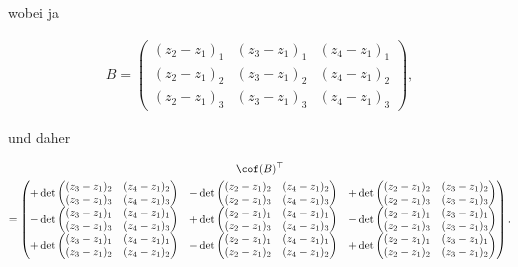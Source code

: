 \begin{solution}
wobei ja

\begin{align*}
  B
  =
  \begin{pmatrix}
    (z_2 - z_1)_1 & (z_3 - z_1)_1 & (z_4 - z_1)_1 \\
    (z_2 - z_1)_2 & (z_3 - z_1)_2 & (z_4 - z_1)_2 \\
    (z_2 - z_1)_3 & (z_3 - z_1)_3 & (z_4 - z_1)_3
  \end{pmatrix},
\end{align*}

und daher

\begin{multline*}
  \cof(B)^\top \\
  =
  \begin{pmatrix}
    +
    \det
    \begin{pmatrix}
      (z_3 - z_1)_2 & (z_4 - z_1)_2 \\
      (z_3 - z_1)_3 & (z_4 - z_1)_3
    \end{pmatrix}
    &
    -
    \det
    \begin{pmatrix}
      (z_2 - z_1)_2 & (z_4 - z_1)_2 \\
      (z_2 - z_1)_3 & (z_4 - z_1)_3
    \end{pmatrix}
    &
    +
    \det
    \begin{pmatrix}
      (z_2 - z_1)_2 & (z_3 - z_1)_2 \\
      (z_2 - z_1)_3 & (z_3 - z_1)_3
    \end{pmatrix}
    \\
    -
    \det
    \begin{pmatrix}
      (z_3 - z_1)_1 & (z_4 - z_1)_1 \\
      (z_3 - z_1)_3 & (z_4 - z_1)_3
    \end{pmatrix}
    &
    +
    \det
    \begin{pmatrix}
      (z_2 - z_1)_1 & (z_4 - z_1)_1 \\
      (z_2 - z_1)_3 & (z_4 - z_1)_3
    \end{pmatrix}
    &
    -
    \det
    \begin{pmatrix}
      (z_2 - z_1)_1 & (z_3 - z_1)_1 \\
      (z_2 - z_1)_3 & (z_3 - z_1)_3
    \end{pmatrix}
    \\
    +
    \det
    \begin{pmatrix}
      (z_3 - z_1)_1 & (z_4 - z_1)_1 \\
      (z_3 - z_1)_2 & (z_4 - z_1)_2
    \end{pmatrix}
    &
    -
    \det
    \begin{pmatrix}
      (z_2 - z_1)_1 & (z_4 - z_1)_1 \\
      (z_2 - z_1)_2 & (z_4 - z_1)_2
    \end{pmatrix}
    &
    +
    \det
    \begin{pmatrix}
      (z_2 - z_1)_1 & (z_3 - z_1)_1 \\
      (z_2 - z_1)_2 & (z_3 - z_1)_2
    \end{pmatrix}
  \end{pmatrix}.
\end{multline*}


\end{solution}
